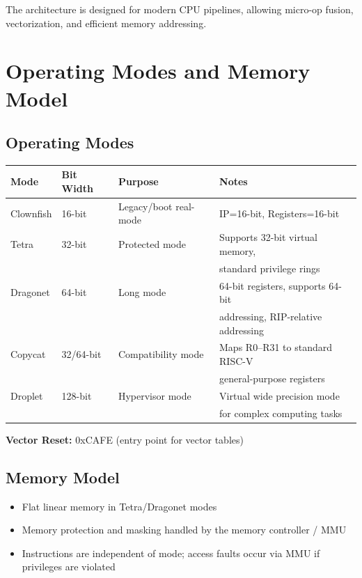 \documentclass[12pt]{article}
\begin{document}
The architecture is designed for modern CPU pipelines, allowing micro-op fusion, vectorization, and efficient memory addressing.

\section{Operating Modes and Memory Model}

\subsection{Operating Modes}

\begin{table}[h]
\centering
\begin{tabular}{@{}llll@{}}
\toprule
\textbf{Mode} & \textbf{Bit Width} & \textbf{Purpose} & \textbf{Notes} \\ \midrule
Clownfish & 16-bit & Legacy/boot real-mode & IP=16-bit, Registers=16-bit \\
Tetra & 32-bit & Protected mode & Supports 32-bit virtual memory, \\
 &  &  & standard privilege rings \\
Dragonet & 64-bit & Long mode & 64-bit registers, supports 64-bit \\
 &  &  & addressing, RIP-relative addressing \\
Copycat & 32/64-bit & Compatibility mode & Maps R0--R31 to standard RISC-V \\
 &  &  & general-purpose registers \\ 
 Droplet & 128-bit & Hypervisor mode & Virtual wide precision mode \\ & & & for complex computing tasks\\ \bottomrule
\end{tabular}
\end{table}

\textbf{Vector Reset:} 0xCAFE (entry point for vector tables)

\subsection{Memory Model}

\begin{itemize}
    \item Flat linear memory in Tetra/Dragonet modes
    \item Memory protection and masking handled by the memory controller / MMU
    \item Instructions are independent of mode; access faults occur via MMU if privileges are violated
\end{itemize}
\end{document}
